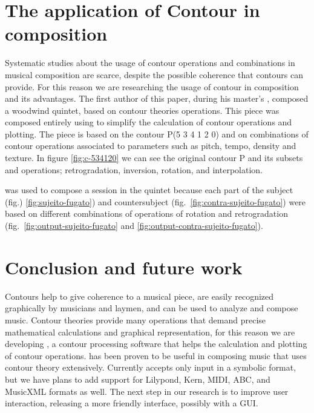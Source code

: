 \documentclass[a0paper]{sciposter}
\begin{document}
\begin{multicols}{3}

\section{The application of Contour in composition}

Systematic studies about the usage of contour operations and
combinations in musical composition are scarce, despite the possible
coherence that contours can provide. For this reason we are
researching the usage of contour in composition and its advantages.
The first author of this paper, during his master's
\cite{sampaio08:em}, composed a woodwind quintet, based on contour
theories operations. 
This piece was composed entirely using \goiaba{} to simplify the
calculation of contour operations and plotting. The piece is based on
the contour P(5 3 4 1 2 0) and on combinations of contour operations
associated to parameters such as pitch, tempo, density and texture. In
figure \ref{fig:c-534120} we can see the original contour P and its
subsets and operations; retrogradation, inversion, rotation, and
interpolation.

\goiaba{} was used to compose a  session in the quintet
because each part of the subject (fig.) \ref{fig:sujeito-fugato}) and
countersubject (fig.~\ref{fig:contra-sujeito-fugato}) were based on
different combinations of operations of rotation and retrogradation
(fig.~\ref{fig:output-sujeito-fugato} and
\ref{fig:output-contra-sujeito-fugato}).

\section{Conclusion and future work}

Contours help to give coherence to a musical piece, are easily
recognized graphically by musicians and laymen, and can be used to
analyze and compose music. Contour theories provide many operations
that demand precise mathematical calculations and graphical
representation, for this reason we are developing \goiaba{}, a contour
processing software that helps the calculation and plotting of contour
operations. \goiaba{} has been proven to be useful in composing music
that uses contour theory extensively. Currently \goiaba{} accepts only
input in a symbolic format, but we have plans to add support for
Lilypond, Kern, MIDI, ABC, and MusicXML formats as well. The next step
in our research is to improve \goiaba{} user interaction, releasing a
more friendly interface, possibly with a GUI.

\renewcommand{\refname}{References}



\end{multicols}
\end{document}
